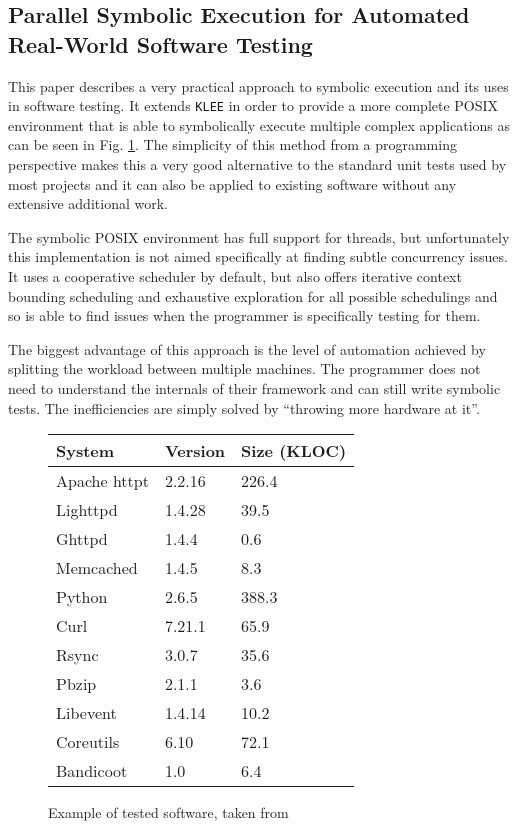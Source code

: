 \documentclass[10pt]{llncs}
\begin{document}
\subsection{Parallel Symbolic Execution for Automated Real-World Software Testing \cite{base3}}

This paper describes a very practical approach to symbolic execution and its uses in software testing. It extends \texttt{KLEE} \cite{klee} in order to provide a more complete POSIX environment that is able to symbolically execute multiple complex applications as can be seen in Fig. \ref{example:3}. The simplicity of this method from a programming perspective makes this a very good alternative to the standard unit tests used by most projects and it can also be applied to existing software without any extensive additional work.

The symbolic POSIX environment has full support for threads, but unfortunately this implementation is not aimed specifically at finding subtle concurrency issues. It uses a cooperative scheduler by default, but also offers iterative context bounding scheduling \cite{Musuvathi} and exhaustive exploration for all possible schedulings and so is able to find issues when the programmer is specifically testing for them.

The biggest advantage of this approach is the level of automation achieved by splitting the workload between multiple machines. The programmer does not need to understand the internals of their framework and can still write symbolic tests. The inefficiencies are simply solved by ``throwing more hardware at it''.

\begin{figure}
	\centering
	
	\begin{tabular}{l l l}
		System & Version & Size (KLOC) \\
		\hline
		Apache httpt & 2.2.16 & 226.4 \\
		Lighttpd & 1.4.28 & 39.5 \\
		Ghttpd & 1.4.4 & 0.6 \\
		Memcached & 1.4.5 & 8.3 \\
		Python & 2.6.5 & 388.3 \\
		Curl & 7.21.1 & 65.9 \\
		Rsync & 3.0.7 & 35.6 \\
		Pbzip & 2.1.1 & 3.6 \\
		Libevent & 1.4.14 & 10.2 \\
		Coreutils & 6.10 & 72.1 \\
		Bandicoot & 1.0 & 6.4
	\end{tabular}
	
	\caption{Example of tested software, taken from \cite{base3}}
	\label{example:3}
\end{figure}
\end{document}
